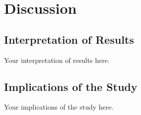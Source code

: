 \chapter{Discussion}
\section{Interpretation of Results}
Your interpretation of results here.
\section{Implications of the Study}
Your implications of the study here.
